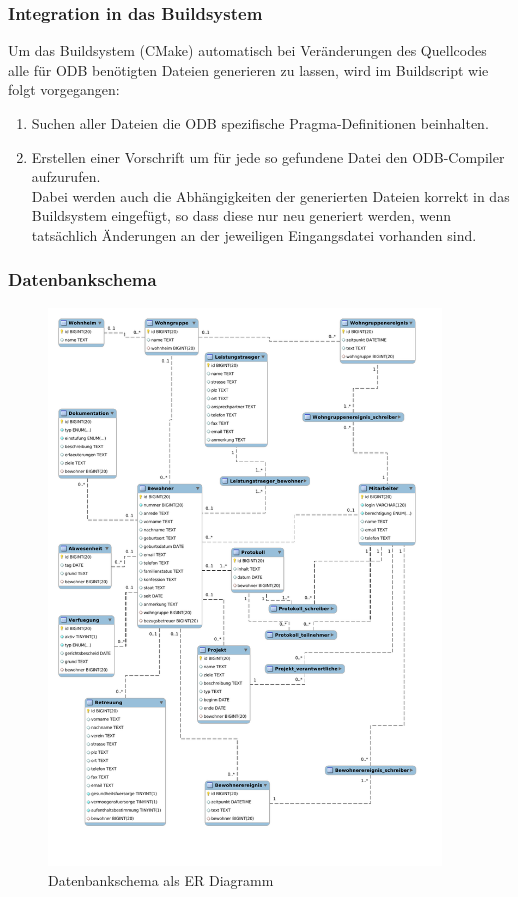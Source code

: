 \subsubsection{Integration in das Buildsystem}
Um das Buildsystem (CMake) automatisch bei Veränderungen des Quellcodes alle für ODB benötigten Dateien generieren zu lassen, wird im Buildscript wie folgt vorgegangen:
\begin{enumerate}
\item Suchen aller Dateien die ODB spezifische Pragma-Definitionen beinhalten.
\item Erstellen einer Vorschrift um für jede so gefundene Datei den ODB-Compiler aufzurufen.\\
	Dabei werden auch die Abhängigkeiten der generierten Dateien korrekt in das Buildsystem eingefügt, so dass diese nur neu generiert werden, wenn tatsächlich Änderungen an der jeweiligen Eingangsdatei vorhanden sind.
\end{enumerate}

\newpage

\subsubsection{Datenbankschema}
\begin{figure}[htp!]
	\begin{center}
		\includegraphics[width=0.93\textwidth]{scheme}
	\end{center}
	\caption{Datenbankschema als ER Diagramm}
	\label{ERDiagram}
\end{figure}

